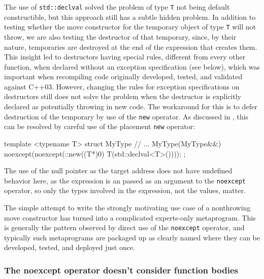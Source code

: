 \noindent The use of \lstinline!std::declval! solved the problem of type \lstinline!T!
not being default constructible, but this approach still has a subtle
hidden problem. In addition to testing whether the move constructor for
the temporary object of type \lstinline!T! will not throw, we are also
testing the destructor of that temporary, since, by their nature,
temporaries are destroyed at the end of the expression that creates
them. This insight led to destructors having special rules, different
from every other function, when declared without an exception
specification (see  below), which was important when
recompiling code originally developed, tested, and validated against
C++03. However, changing the rules for exception specifications on
destructors still does not solve the problem when the destructor is
explicitly declared as potentially throwing in new code. The workaround
for this is to defer destruction of the temporary by use of the
\lstinline!new! operator. As discussed in , this can be
resolved by careful use of the placement \lstinline!new! operator:

\begin{emcppslisting}[emcppsbatch=e27]
template <typename T>
struct MyType
{
    // ...
    MyType(MyType&&) noexcept(noexcept(::new((T*)0) T(std::declval<T>())));
};
\end{emcppslisting}
    

\noindent The use of the null pointer as the target address does not have
undefined behavior here, as the expression is an  passed as an argument to the \lstinline!noexcept! operator, so
only the types involved in the expression, not the values, matter.

The simple attempt to write the strongly motivating use case of a
nonthrowing move constructor has turned into a complicated experts-only
metaprogram. This is generally the pattern observed by direct use of the
\lstinline!noexcept! operator, and typically such metaprograms are packaged
up as clearly named  where they can be developed,
tested, and deployed just once.

\subsubsection[The \lstinline!noexcept! operator doesn’t consider function bodies]{The {\SubsubsecCode noexcept} operator doesn’t consider function bodies}\label{the-noexcept-operator-doesn’t-consider-function-bodies}

